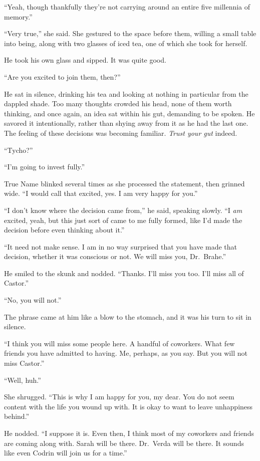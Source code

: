 ``Yeah, though thankfully they're not carrying around an entire five millennia of memory.''

``Very true,'' she said. She gestured to the space before them, willing a small table into being, along with two glasses of iced tea, one of which she took for herself.

He took his own glass and sipped. It was quite good.

``Are you excited to join them, then?''

He sat in silence, drinking his tea and looking at nothing in particular from the dappled shade. Too many thoughts crowded his head, none of them worth thinking, and once again, an idea sat within his gut, demanding to be spoken. He savored it intentionally, rather than shying away from it as he had the last one. The feeling of these decisions was becoming familiar. \emph{Trust your gut} indeed.

``Tycho?''

``I'm going to invest fully.''

True Name blinked several times as she processed the statement, then grinned wide. ``I would call that excited, yes. I am very happy for you.''

``I don't know where the decision came from,'' he said, speaking slowly. ``I \emph{am} excited, yeah, but this just sort of came to me fully formed, like I'd made the decision before even thinking about it.''

``It need not make sense. I am in no way surprised that you have made that decision, whether it was conscious or not. We will miss you, Dr.~Brahe.''

He smiled to the skunk and nodded. ``Thanks. I'll miss you too. I'll miss all of Castor.''

``No, you will not.''

The phrase came at him like a blow to the stomach, and it was his turn to sit in silence.

``I think you will miss some people here. A handful of coworkers. What few friends you have admitted to having. Me, perhaps, as you say. But you will not miss Castor.''

``Well, huh.''

She shrugged. ``This is why I am happy for you, my dear. You do not seem content with the life you wound up with. It is okay to want to leave unhappiness behind.''

He nodded. ``I suppose it is. Even then, I think most of my coworkers and friends are coming along with. Sarah will be there. Dr.~Verda will be there. It sounds like even Codrin will join us for a time.''

